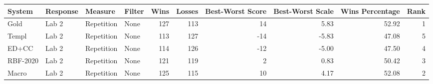 \begin{tabular}{llllrrrrrr}
\toprule
System & Response & Measure & Filter & Wins & Losses & Best-Worst Score & Best-Worst Scale & Wins Percentage & Rank \\
\midrule
Gold & Lab 2 & Repetition & None & 127 & 113 & 14 & 5.83 & 52.92 & 1 \\
Templ & Lab 2 & Repetition & None & 113 & 127 & -14 & -5.83 & 47.08 & 5 \\
ED+CC & Lab 2 & Repetition & None & 114 & 126 & -12 & -5.00 & 47.50 & 4 \\
RBF-2020 & Lab 2 & Repetition & None & 121 & 119 & 2 & 0.83 & 50.42 & 3 \\
Macro & Lab 2 & Repetition & None & 125 & 115 & 10 & 4.17 & 52.08 & 2 \\
\bottomrule
\end{tabular}
